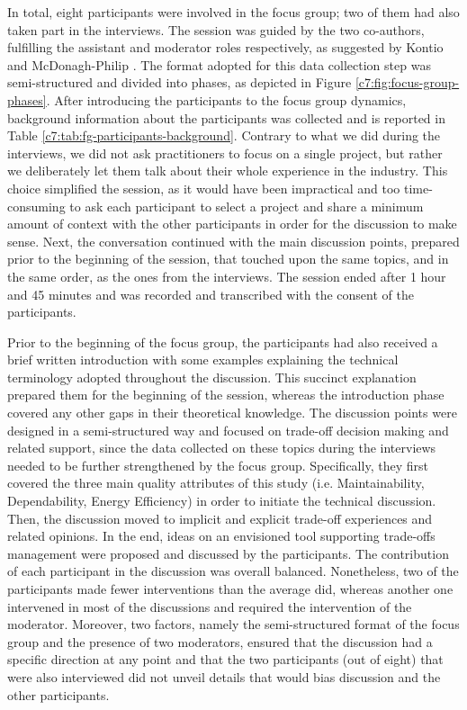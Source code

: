 In total, eight participants were involved in the focus group; two of them had also taken part in the interviews.
The session was guided by the two co-authors, fulfilling the assistant and moderator roles respectively, as suggested by Kontio \cite{Kontio2008} and McDonagh-Philip \cite{Mcdonagh2000}.
The format adopted for this data collection step was semi-structured and divided into phases, as depicted in Figure \ref{c7:fig:focus-group-phases}.
After introducing the participants to the focus group dynamics, background information about the participants was collected and is reported in Table \ref{c7:tab:fg-participants-background}.
Contrary to what we did during the interviews, we did not ask practitioners to focus on a single project, but rather we deliberately let them talk about their whole experience in the industry. This choice simplified the session, as it would have been impractical and too time-consuming to ask each participant to select a project and share a minimum amount of context with the other participants in order for the discussion to make sense.
Next, the conversation continued with the main discussion points, prepared prior to the beginning of the session, that touched upon the same topics, and in the same order, as the ones from the interviews. 
The session ended after 1 hour and 45 minutes and was recorded and transcribed with the consent of the participants.

Prior to the beginning of the focus group, the participants had also received a brief written introduction with some examples explaining the technical terminology adopted throughout the discussion.
This succinct explanation prepared them for the beginning of the session, whereas the introduction phase covered any other gaps in their theoretical knowledge.
The discussion points were designed in a semi-structured way and focused on trade-off decision making and related support, since the data collected on these topics during the interviews needed to be further strengthened by the focus group.
Specifically, they first covered the three main quality attributes of this study (i.e. Maintainability, Dependability, Energy Efficiency) in order to initiate the technical discussion.
Then, the discussion moved to implicit and explicit trade-off experiences and related opinions.
In the end, ideas on an envisioned tool supporting trade-offs management were proposed and discussed by the participants.
The contribution of each participant in the discussion was overall balanced.
Nonetheless, two of the participants made fewer interventions than the average did, whereas another one intervened in most of the discussions and required the intervention of the moderator.
Moreover, two factors, namely the semi-structured format of the focus group and the presence of two moderators, ensured that the discussion had a specific direction at any point and that the two participants (out of eight) that were also interviewed did not unveil details that would bias discussion and the other participants.


